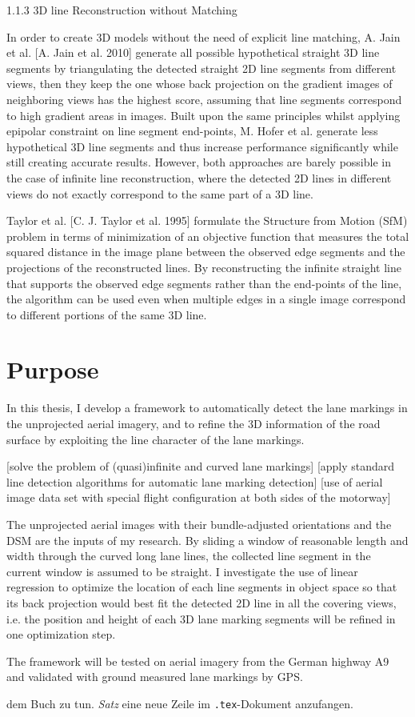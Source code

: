 1.1.3 3D line Reconstruction without Matching

In order to create 3D models without the need of explicit line matching, A. Jain et al. [A. Jain et al. 2010] generate all possible hypothetical straight 3D line segments by triangulating the detected straight 2D line segments from different views, then they keep the one whose back projection on the gradient images of neighboring views has the highest score, assuming that line segments correspond to high gradient areas in images. Built upon the same principles whilst applying epipolar constraint on line segment end-points, M. Hofer et al. generate less hypothetical 3D line segments and thus increase performance significantly while still creating accurate results. However, both approaches are barely possible in the case of infinite line reconstruction, where the detected 2D lines in different views do not exactly correspond to the same part of a  3D line.

Taylor et al. [C. J. Taylor et al. 1995] formulate the Structure from Motion (SfM) problem in terms of minimization of an objective function that measures the total squared distance in the image plane between the observed edge segments and the projections of the reconstructed lines. By reconstructing the infinite straight line that supports the observed edge segments rather than the end-points of the line, the algorithm can be used even when multiple edges in a single image correspond to different portions of the same 3D line.

\section{Purpose}

In this thesis, I develop a framework to automatically detect the lane markings in the unprojected aerial imagery, and to refine the 3D information of the road surface by exploiting the line character of the lane markings.

[solve the problem of (quasi)infinite and curved lane markings]
[apply standard line detection algorithms for automatic lane marking detection]
[use of aerial image data set with special flight configuration at both sides of the motorway]

The unprojected aerial images with their bundle-adjusted orientations and the DSM are the inputs of my research. By sliding a window of reasonable length and width through the curved long lane lines, the collected line segment in the current window is assumed to be straight. I investigate the use of linear regression to optimize the location of each line segments in object space so that its back projection would best fit the detected 2D line in all the covering views, i.e. the position and height of each 3D lane marking segments will be refined in one optimization step.

The framework will be tested on aerial imagery from the German highway A9 and validated with ground measured lane markings by GPS.

 dem Buch \cite{WSPA} zu tun.
\emph{Satz} eine neue Zeile im \texttt{.tex}-Dokument anzufangen.

